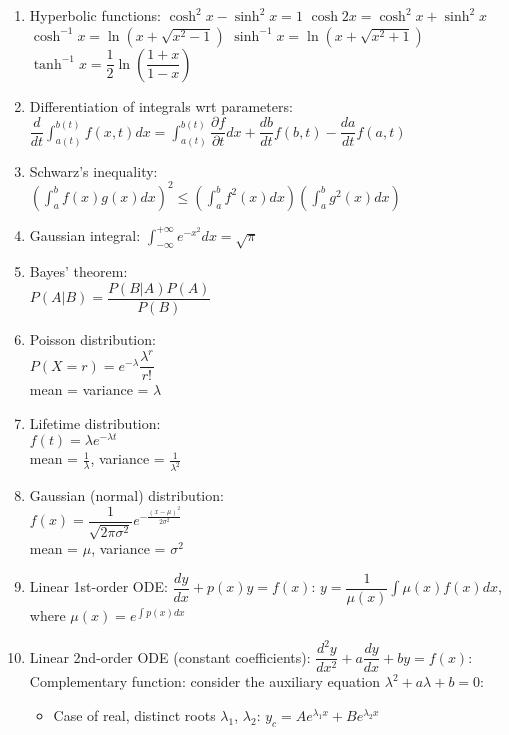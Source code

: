 \documentclass[fleqn]{article}
\begin{document}
\begin{enumerate}
    \item Hyperbolic functions:\smallbreak
        $\cosh^2 x-\sinh^2 x=1$\smallbreak
        $\cosh2x=\cosh^2 x+\sinh^2 x$\smallbreak
        $\cosh^{-1}x=\ln(x+\sqrt{x^2-1})$\smallbreak
        $\sinh^{-1}x=\ln(x+\sqrt{x^2+1})$\smallbreak
        $\tanh^{-1}x=\dfrac{1}{2}\ln\left(\dfrac{1+x}{1-x}\right)$
    \item Differentiation of integrals wrt parameters:\smallbreak
        $\dfrac{d}{dt}\displaystyle\int_{a(t)}^{b(t)}f(x,t)dx=\displaystyle\int_{a(t)}^{b(t)}\dfrac{\partial f}{\partial t}dx+\dfrac{db}{dt}f(b,t)-\dfrac{da}{dt}f(a,t)$
    \item Schwarz's inequality:\smallbreak
        $\left(\displaystyle\int_a^b f(x)g(x)dx\right)^2\leq\left(\displaystyle\int_a^b f^2(x)dx\right)\left(\displaystyle\int_a^b g^2(x)dx\right)$
    \item Gaussian integral:\smallbreak
        $\displaystyle\int_{-\infty}^{+\infty}e^{-x^2}dx=\sqrt{\pi}$
    \item Bayes' theorem:\\
        $P(A|B)=\dfrac{P(B|A)P(A)}{P(B)}$
    \item Poisson distribution:\\
        $P(X=r)=e^{-\lambda}\dfrac{\lambda^r}{r!}$\\
        mean = variance = $\lambda$
    \item Lifetime distribution:\\
        $f(t)=\lambda e^{-\lambda t}$\\
        mean = $\frac{1}{\lambda}$, variance = $\frac{1}{\lambda^2}$\\
    \item Gaussian (normal) distribution:\\
        $f(x)=\dfrac{1}{\sqrt{2\pi\sigma^2}}e^{-\frac{(x-\mu)^2}{2\sigma^2}}$\\
        mean = $\mu$, variance = $\sigma^2$
    \item Linear 1st-order ODE:\smallbreak
        $\dfrac{dy}{dx}+p(x)y=f(x)$:\smallbreak
        $y=\dfrac{1}{\mu(x)}\displaystyle\int\mu(x)f(x)dx$, where $\mu(x)=e^{\int p(x)dx}$
    \item Linear 2nd-order ODE (constant coefficients):\smallbreak
        $\dfrac{d^2y}{dx^2}+a\dfrac{dy}{dx}+by=f(x)$:\smallbreak
        Complementary function: consider the auxiliary equation $\lambda^2+a\lambda+b=0$:
        \begin{itemize}[noitemsep, topsep=0pt]
            \item Case of real, distinct roots $\lambda_1$, $\lambda_2$: $y_c=Ae^{\lambda_1x}+Be^{\lambda_2x}$

\end{itemize}
\end{enumerate}
\end{document}
